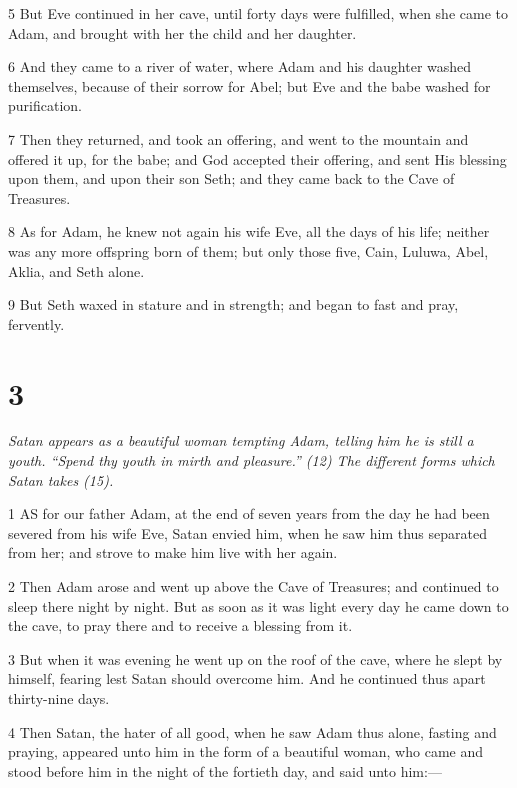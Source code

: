 \par 5 But Eve continued in her cave, until forty days were fulfilled, when she came to Adam, and brought with her the child and her daughter.

\par 6 And they came to a river of water, where Adam and his daughter washed themselves, because of their sorrow for Abel; but Eve and the babe washed for purification.

\par 7 Then they returned, and took an offering, and went to the mountain and offered it up, for the babe; and God accepted their offering, and sent His blessing upon them, and upon their son Seth; and they came back to the Cave of Treasures.

\par 8 As for Adam, he knew not again his wife Eve, all the days of his life; neither was any more offspring born of them; but only those five, Cain, Luluwa, Abel, Aklia, and Seth alone.

\par 9 But Seth waxed in stature and in strength; and began to fast and pray, fervently.

\chapter{3}

\par \textit{Satan appears as a beautiful woman tempting Adam, telling him he is still a youth. “Spend thy youth in mirth and pleasure.” (12) The different forms which Satan takes (15).}

\par 1 AS for our father Adam, at the end of seven years from the day he had been severed from his wife Eve, Satan envied him, when he saw him thus separated from her; and strove to make him live with her again.

\par 2 Then Adam arose and went up above the Cave of Treasures; and continued to sleep there night by night. But as soon as it was light every day he came down to the cave, to pray there and to receive a blessing from it.

\par 3 But when it was evening he went up on the roof of the cave, where he slept by himself, fearing lest Satan should overcome him. And he continued thus apart thirty-nine days.

\par 4 Then Satan, the hater of all good, when he saw Adam thus alone, fasting and praying, appeared unto him in the form of a beautiful woman, who came and stood before him in the night of the fortieth day, and said unto him:—

